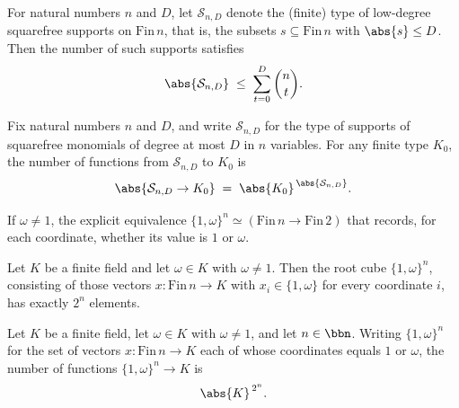 \begin{theorem}
\label{RazborovSmolensky.lowDegreeSupport_card_le_binomial_sum}
\leanok
{}
For natural numbers $n$ and $D$, let $\mathcal{S}_{n,D}$ denote the (finite) type of
low-degree squarefree supports on $\mathrm{Fin}\,n$, that is, the subsets $s \subseteq
\mathrm{Fin}\,n$ with $\abs{s} \le D$. Then the number of such supports satisfies
\[
\abs{\mathcal{S}_{n,D}} \;\le\; \sum_{t=0}^{D} \binom{n}{t}.
\]
\end{theorem}

\begin{lemma}
\label{RazborovSmolensky.lowDegreeCoeff_card}
\leanok
{}
Fix natural numbers $n$ and $D$, and write $\mathcal{S}_{n,D}$ for the type of supports
of squarefree monomials of degree at most $D$ in $n$ variables. For any finite type
$K_0$, the number of functions from $\mathcal{S}_{n,D}$ to $K_0$ is
\[
\abs{\mathcal{S}_{n,D} \to K_0} \;=\; \abs{K_0}^{\,\abs{\mathcal{S}_{n,D}}}.
\]
\end{lemma}

\begin{definition}
\label{RazborovSmolensky.rootCubeEquivFinTwo}
\leanok
{}
If $\omega \ne 1$, the explicit equivalence $\{1,\omega\}^n \simeq (\mathrm{Fin}\,n \to
\mathrm{Fin}\,2)$ that records, for each coordinate, whether its value is $1$ or $\omega$.
\end{definition}

\begin{lemma}
\label{RazborovSmolensky.rootCube_card_of_ne_one}
\leanok
{}
Let $K$ be a finite field and let $\omega \in K$ with $\omega \ne 1$. Then the root cube
$\{1,\omega\}^n$, consisting of those vectors $x : \mathrm{Fin}\,n \to K$ with $x_i \in
\{1,\omega\}$ for every coordinate $i$, has exactly $2^n$ elements.
\end{lemma}

\begin{lemma}
\label{RazborovSmolensky.rootCube_function_card_of_ne_one}
\leanok
{}
Let $K$ be a finite field, let $\omega \in K$ with $\omega \ne 1$, and let $n \in \bbn$.
Writing $\{1,\omega\}^n$ for the set of vectors $x : \mathrm{Fin}\,n \to K$ each of
whose coordinates equals $1$ or $\omega$, the number of functions $\{1,\omega\}^n \to K$
is \[ \abs{K}^{\,2^n}. \]
\end{lemma}

